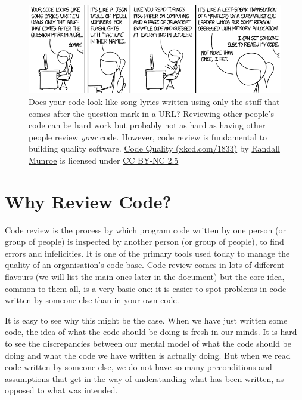 \documentclass[
]{book}
\begin{document}
\begin{figure}

{\centering \includegraphics[width=1\linewidth]{images/code_quality_3} 

}

\caption{Does your code look like song lyrics written using only the stuff that comes after the question mark in a URL? Reviewing other people's code can be hard work but probably not as hard as having other people review \emph{your} code. However, code review is fundamental to building quality software. \href{https://xkcd.com/1833/}{Code Quality (xkcd.com/1833)} by \href{https://en.wikipedia.org/wiki/Randall_Munroe}{Randall Munroe} is licensed under \href{https://creativecommons.org/licenses/by-nc/2.5/}{CC BY-NC 2.5}}\label{fig:xkcd-code-quality-fig}
\end{figure}



\hypertarget{why}{%
\section{Why Review Code?}\label{why}}

Code review is the process by which program code written by one person (or group of people) is inspected by another person (or group of people), to find errors and infelicities. It is one of the primary tools used today to manage the quality of an organisation's code base. Code review comes in lots of different flavours (we will list the main ones later in the document) but the core idea, common to them all, is a very basic one: it is easier to spot problems in code written by someone else than in your own code.

It is easy to see why this might be the case. When we have just written some code, the idea of what the code should be doing is fresh in our minds. It is hard to see the discrepancies between our mental model of what the code should be doing and what the code we have written is actually doing. But when we read code written by someone else, we do not have so many preconditions and assumptions that get in the way of understanding what has been written, as opposed to what was intended.
\end{document}
